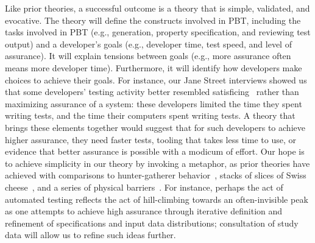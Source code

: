 Like prior theories, a successful outcome is a theory that is simple, validated,
and evocative. The theory will define the constructs involved in PBT,
including the tasks involved in PBT (e.g., generation, property specification,
and reviewing test output) and a developer's goals (e.g., developer time, test
speed, and level of assurance). It will explain tensions between goals (e.g.,
more assurance often means more developer time). Furthermore, it will identify
how developers make choices to achieve their goals. For instance, our Jane
Street interviews showed us that some developers' testing activity
better resembled satisficing~\cite{ref:brown2004consideration} rather than maximizing
assurance of a system: these developers limited the time they spent writing
tests, and the time their computers spent writing tests. A theory that brings
these elements together would suggest that for such developers to
achieve higher assurance, they need faster tests, tooling that takes less time
to use, or evidence that better assurance is possible with a modicum
of effort. Our hope is to achieve simplicity in our theory by invoking a
metaphor, as prior theories have achieved with comparisons to hunter-gatherer
behavior~\cite{ref:pirolli2003exploring}, stacks of slices of Swiss
cheese~\cite{ref:ko2005framework}, and a series of physical
barriers~\cite{ref:ko2004six}. For instance, perhaps the act of automated
testing reflects the act of hill-climbing towards an often-invisible peak as one
attempts to achieve high assurance through iterative definition and refinement of
specifications and input data distributions; consultation of study data will
allow us to refine such ideas further.

 

